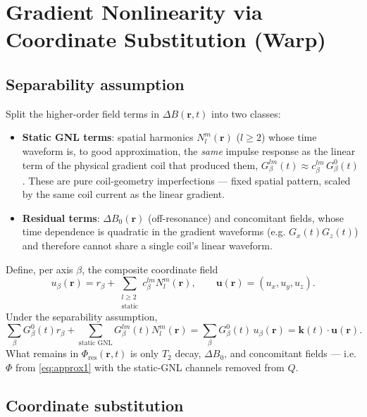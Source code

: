 \documentclass{article}
\begin{document}
\section{Gradient Nonlinearity via Coordinate Substitution (Warp)}

\subsection{Separability assumption}

Split the higher-order field terms in $\Delta B(\mathbf{r},t)$ into two classes:
\begin{itemize}
    \item \textbf{Static GNL terms}: spatial harmonics $N^m_l(\mathbf{r})$ ($l\ge2$) whose
          time waveform is, to good approximation, the \emph{same} impulse response as the
          linear term of the physical gradient coil that produced them,
          $G^{lm}_\beta(t) \approx c^{lm}_\beta\, G^0_\beta(t)$. These are pure coil-geometry
          imperfections — fixed spatial pattern, scaled by the same coil current as the
          linear gradient.
    \item \textbf{Residual terms}: $\Delta B_0(\mathbf{r})$ (off-resonance) and concomitant
          fields, whose time dependence is quadratic in the gradient waveforms (e.g.
          $G_x(t)G_z(t)$) and therefore cannot share a single coil's linear waveform.
\end{itemize}
Define, per axis $\beta$, the composite coordinate field
\begin{equation}
    u_\beta(\mathbf{r}) = r_\beta + \sum_{\substack{l\ge2 \\ \text{static}}} c^{lm}_\beta N^m_l(\mathbf{r}),
    \qquad \mathbf{u}(\mathbf{r}) = (u_x,u_y,u_z).
\end{equation}
Under the separability assumption,
\begin{equation}
    \sum_\beta G^0_\beta(t) r_\beta + \sum_{\text{static GNL}} G^{lm}_\beta(t)N^m_l(\mathbf{r})
    = \sum_\beta G^0_\beta(t)\,u_\beta(\mathbf{r}) = \mathbf{k}(t)\cdot\mathbf{u}(\mathbf{r}).
\end{equation}
What remains in $\Phi_{\mathrm{res}}(\mathbf{r},t)$ is only $T_2$ decay, $\Delta B_0$, and
concomitant fields — i.e. $\Phi$ from \eqref{eq:approx1} with the static-GNL channels removed
from $Q$.

\subsection{Coordinate substitution}
\end{document}
